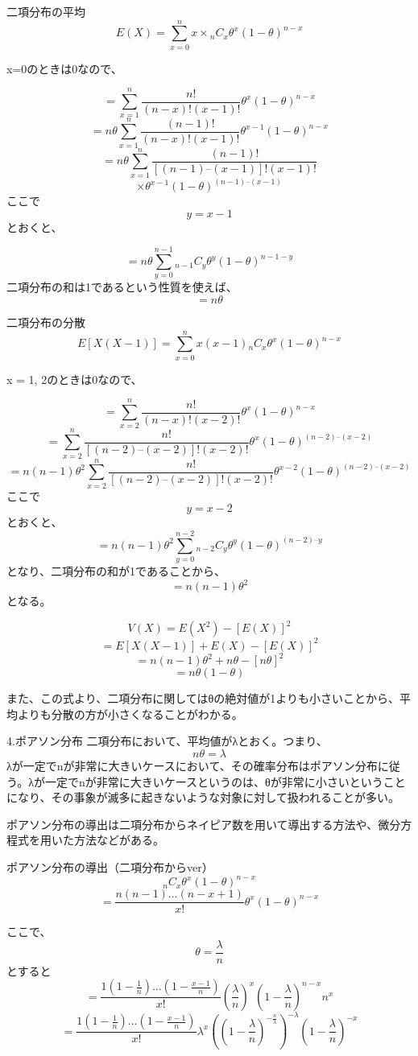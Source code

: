 \documentclass[]{article}
\begin{document}
二項分布の平均
\[E(X)=\sum_{x=0}^{n}x \times {}_n C_x \theta^x(1-\theta)^{n-x} \]

x=0のときは0なので、

\[ = \sum_{x=1}^{n} \frac{n!}{(n-x)!(x-1)!}\theta^x(1-\theta)^{n-x}\]
\[ = n \theta \sum_{x=1}^{n} \frac{(n-1)!}{(n-x)!(x-1)!}\theta^{x-1}(1-\theta)^{n-x}\]
\[ = n \theta \sum_{x=1}^{n} \frac{(n-1)!}{\left[ (n-1) – (x-1) \right]!(x-1)!}\]
\[ \times \theta^{x-1}(1-\theta)^{ (n-1) – (x-1) } \] ここで \[y = x-1\]
とおくと、

\[ = n \theta \sum_{y=0}^{n-1} {}_{n-1} C_y \theta^y(1-\theta)^{n-1-y}\]
二項分布の和は1であるという性質を使えば、 \[ = n \theta \]

二項分布の分散
\[E[X(X-1)] = \sum_{x=0}^{n} x(x-1) {}_n C_x \theta^x(1-\theta)^{n-x} \]

x = 1, 2のときは0なので、

\[= \sum_{x=2}^{n} \frac{n!}{(n-x)!(x-2)!} \theta^x(1-\theta)^{n-x} \]
\[= \sum_{x=2}^{n} \frac{n!}{\left[ (n-2) – (x-2) \right]!(x-2)!} \theta^x(1-\theta)^{(n-2) – (x-2) } \]
\[= n(n-1)\theta^2 \sum_{x=2}^{n} \frac{n!}{\left[ (n-2) – (x-2) \right]!(x-2)!} \theta^{x-2}(1-\theta)^{(n-2) – (x-2) } \]
ここで \[y = x -2\] とおくと、
\[= n(n-1)\theta^2 \sum_{y=0}^{n-2} {}_{n-2} C_y \theta^y(1-\theta)^{(n-2) – y } \]
となり、二項分布の和が1であることから、 \[= n(n-1)\theta^2\] となる。

\[V(X)=E(X^2)-[ E(X) ]^2\] \[ =E[X(X-1)] + E(X) -[ E(X) ]^2\]
\[ =n(n-1)\theta^2 + n \theta -[ n \theta ]^2\] \[ =n\theta(1-\theta)\]

また、この式より、二項分布に関してはθの絶対値が1よりも小さいことから、平均よりも分散の方が小さくなることがわかる。

4.ポアソン分布 二項分布において、平均値がλとおく。つまり、
\[n\theta = \lambda\]
λが一定でnが非常に大きいケースにおいて、その確率分布はポアソン分布に従う。λが一定でnが非常に大きいケースというのは、θが非常に小さいということになり、その事象が滅多に起きないような対象に対して扱われることが多い。

ポアソン分布の導出は二項分布からネイピア数を用いて導出する方法や、微分方程式を用いた方法などがある。

ポアソン分布の導出（二項分布からver）
\[{}_{n} C_x \theta^x(1-\theta)^{n-x}\]
\[ = \frac{n(n-1) \dots (n-x+1)}{x!} \theta^x(1-\theta)^{n-x}\]

ここで、 \[\theta = \frac{\lambda}{n}\] とすると
\[ = \frac{1\left(1-\frac{1}{n}\right) \dots \left(1-\frac{x-1}{n}\right)}{x!} \left(\frac{\lambda}{n}\right)^x\left(1-\frac{\lambda}{n}\right)^{n-x}n^x\]
\[ = \frac{1\left(1-\frac{1}{n}\right) \dots \left(1-\frac{x-1}{n}\right)}{x!} \lambda^x\left(\left(1-\frac{\lambda}{n}\right)^{-\frac{n}{\lambda}}\right)^{-\lambda} \left(1-\frac{\lambda}{n}\right)^{-x}\]
\end{document}
